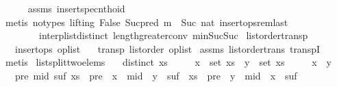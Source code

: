 \begin{isabellebody}
\ \ \ \ \isamarkupfalse%
\ assms\ insert{\isacharunderscore}spec{\isacharunderscore}nth{\isacharunderscore}oid\isanewline
\ \ \ \ \isamarkupfalse%
\ {\isacharparenleft}metis\ {\isacharparenleft}no{\isacharunderscore}types{\isacharcomma}\ lifting{\isacharparenright}\ False\ Suc{\isacharunderscore}pred{\isacharprime}\ {\isacartoucheopen}m\ {\isacharequal}\ Suc\ nat{\isacartoucheclose}\ insert{\isacharunderscore}ops{\isacharunderscore}rem{\isacharunderscore}last\isanewline
\ \ \ \ \ \ \ \ interp{\isacharunderscore}list{\isacharunderscore}distinct\ length{\isacharunderscore}greater{\isacharunderscore}{}{\isacharunderscore}conv\ min{\isacharunderscore}Suc{\isacharunderscore}Suc{\isacharparenright}\isanewline
{}\isamarkupfalse%
%
\endisatagproof
{\isafoldproof}%
%
\isadelimproof
\isanewline
%
\endisadelimproof
\isanewline
{}\isamarkupfalse%
\ list{\isacharunderscore}order{\isacharunderscore}transp{\isacharcolon}\isanewline
\ \ \ {\isachardoublequoteopen}insert{\isacharunderscore}ops\ op{\isacharunderscore}list{\isachardoublequoteclose}\isanewline
\ \ \ {\isachardoublequoteopen}transp\ {\isacharparenleft}list{\isacharunderscore}order\ op{\isacharunderscore}list{\isacharparenright}{\isachardoublequoteclose}\isanewline
%
\isadelimproof
%
\endisadelimproof
%
\isatagproof
{}\isamarkupfalse%
\ assms\ list{\isacharunderscore}order{\isacharunderscore}trans\ transpI\ \isamarkupfalse%
\ metis%
\endisatagproof
{\isafoldproof}%
%
\isadelimproof
\isanewline
%
\endisadelimproof
\isanewline
{}\isamarkupfalse%
\ list{\isacharunderscore}split{\isacharunderscore}two{\isacharunderscore}elems{\isacharcolon}\isanewline
\ \ \ {\isachardoublequoteopen}distinct\ xs{\isachardoublequoteclose}\isanewline
\ \ \ \ \ {\isachardoublequoteopen}x\ {\isasymin}\ set\ xs{\isachardoublequoteclose}\ \ {\isachardoublequoteopen}y\ {\isasymin}\ set\ xs{\isachardoublequoteclose}\isanewline
\ \ \ \ \ {\isachardoublequoteopen}x\ {\isasymnoteq}\ y{\isachardoublequoteclose}\isanewline
\ \ \ {\isachardoublequoteopen}{\isasymexists}pre\ mid\ suf{\isachardot}\ xs\ {\isacharequal}\ pre\ {\isacharat}\ x\ {\isacharhash}\ mid\ {\isacharat}\ y\ {\isacharhash}\ suf\ {\isasymor}\ xs\ {\isacharequal}\ pre\ {\isacharat}\ y\ {\isacharhash}\ mid\ {\isacharat}\ x\ {\isacharhash}\ suf{\isachardoublequoteclose}\isanewline
%
\isadelimproof
%
\endisadelimproof
%
\isatagproof
{}\isamarkupfalse%

\end{isabellebody}
